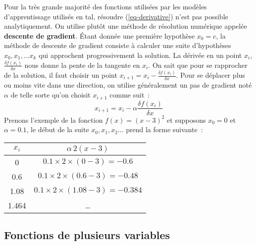 \documentclass[11pt,openany]{book}
\newcommand{\ac}[1]{{\sc #1}} %
\newcommand{\kw}[1]{{\bf #1}} %
\begin{document}
Pour la très grande majorité  des fonctions utilisées par les modèles
d'apprentissage utilisés en \ac{tal},
résoudre (\ref{eq-derivative}) n'est pas possible analytiquement. On
utilise plutôt une méthode de résolution numérique appelée \kw{descente de gradient}.
\'Etant donnée une première hypothèse $x_0 = c$, la méthode de
descente de gradient consiste à calculer une suite d'hypothèses
$x_0,x_1,\ldots x_k$ qui approchent progressivement la solution.
La dérivée en un point $x_i$, $\frac{\delta f(x_i)}{\delta x}$ nous donne
la pente de la tangente en $x_i$. On sait que pour se rapprocher de la
solution, il faut choisir un point $x_{i+1} = x_i - \frac{\delta
  f(x_i)}{\delta x}$. Pour se déplacer plus ou moins vite dans une
direction, on utilise généralement un pas de gradient noté $\alpha$ de
telle sorte qu'on choisit $x_{i+1}$ comme suit~:
\begin{displaymath}
x_{i+1} = x_i - \alpha   \frac{\delta
  f(x_i)}{\delta x}
\end{displaymath}
Prenons l'exemple  de la fonction $f(x) = (x-3)^2$ et supposons $x_0
= 0$ et $\alpha =  0.1$, le début de la suite $x_0,x_1,x_2\ldots$ prend la forme suivante~:
\begin{center}
\begin{tabular}{cc}\toprule
$x_i$& $\alpha\,  2(x-3)$\\\midrule
0&$0.1\times 2\times (0-3) = -0.6$\\
0.6&$0.1\times 2\times (0.6-3) = -0.48$\\
1.08&$0.1\times 2\times  (1.08-3) = -0.384$\\
1.464&\ldots\\\bottomrule
\end{tabular}
\end{center}

\subsection{Fonctions de plusieurs variables}
\end{document}
